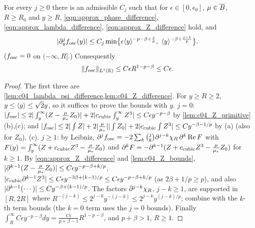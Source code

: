 \begin{lemma}
  \label{lem:approx_phase_differences}
  For every $j\ge0$ there is an admissible $C_j$ such that for $\epsilon\in[0,\epsilon_0]$, $\mu\in\overline{B}$, $R\ge R_0$ and $y\ge R$,
  \eqref{eqn:approx_phase_difference}, \eqref{eqn:approx_lambda_difference}, \eqref{eqn:approx_Z_difference} hold, and
  \begin{equation}\label{eqn:approx_fosc_bounds}
    |\partial^j_yf_{\textup{osc}}(y)|\le C_j\min\bigl\{\epsilon\langle y \rangle^{-p-\beta+\frac jp},\ \langle y \rangle^{-\beta+\frac{j-1}p}\bigr\}.
  \end{equation}
  ($f_{\textup{osc}}=0$ on $(-\infty,R]$.) Consequently
  \begin{equation}\label{eqn:approx_fosc_L1_bound}
    \|f_{\textup{osc}}\|_{L^1(\mathbb{R})}\le C\epsilon R^{1-p-\beta}\le C\epsilon .
  \end{equation}
\end{lemma}
\begin{proof}
  The first three are \cref{lem:c04_lambda_psi_difference,lem:c04_Z_difference}. For $y\ge R\ge2$, $y\le\langle y \rangle\le\sqrt2y$, so it suffices to prove
  the bounds with $y$. $j=0$: $|f_{\textup{osc}}|\le2|\int_y^\infty(Z-\frac\mu{\mu_*}Z_0)|+2|c_{\textup{cubic}}\int_y^\infty Z^3|\le C\epsilon y^{-p-\beta}$ by
  \cref{lem:c04_Z_primitive}(b),(c); and $|f_{\textup{osc}}|\le2|\int Z|+2|\frac\mu{\mu_*}||\int Z_0|+2|c_{\textup{cubic}}\int Z^3|\le Cy^{-\beta-1/p}$ by
  (a) (also for $Z_0$), (c). $j\ge1$: by Leibniz, $\partial^jf_{\textup{osc}}=-2\sum_{k}\binom jk\partial^{j-k}\chi_R\,\partial^k\operatorname{Re}F$ with
  $F(y)=\int_y^\infty(Z+c_{\textup{cubic}}Z^3-\frac\mu{\mu_*}Z_0)$ and $\partial^kF=-\partial^{k-1}(Z+c_{\textup{cubic}}Z^3-\frac\mu{\mu_*}Z_0)$ for $k\ge1$. By
  \eqref{eqn:approx_Z_difference} and \cref{lem:c04_Z_bounds}, $|\partial^{k-1}(Z-\frac\mu{\mu_*}Z_0)|\le C\epsilon y^{-p-\beta+k/p}$,
  $|c_{\textup{cubic}}\partial^{k-1}Z^3|\le C\epsilon y^{-3\beta+(k-1)/p}\le C\epsilon y^{-p-\beta+k/p}$ (as $2\beta+1/p\ge p$), and also
  $|\partial^{k-1}(\cdots)|\le Cy^{-\beta+(k-1)/p}$. The factors $\partial^{j-k}\chi_R$, $j-k\ge1$, are supported in $[R,2R]$ where
  $R^{-(j-k)}\le2^{j-k}y^{-(j-k)}\le2^{j-k}y^{(j-k)/p}$; combine with the $k$-th term bounds (the $k=0$ term uses the $j=0$ bounds).
  Finally $\int_R^\infty C\epsilon y^{-p-\beta}dy=\frac{C\epsilon}{p+\beta-1}R^{1-p-\beta}$, and $p+\beta>1$, $R\ge1$.
\end{proof}


